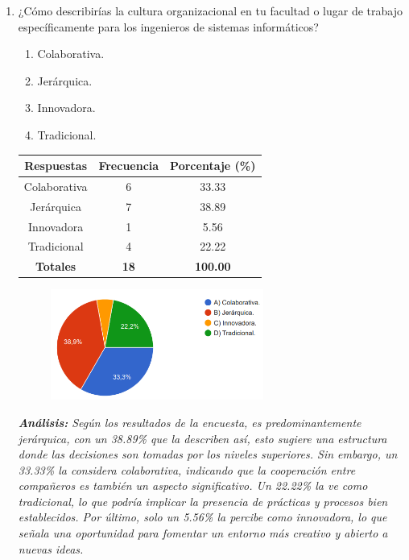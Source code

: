 \documentclass[journal]{IEEEtran}
\begin{document}
\begin{enumerate}
	\item ¿Cómo describirías la cultura organizacional en tu facultad o lugar de trabajo específicamente para los ingenieros de sistemas informáticos?
	\begin{enumerate}
		\item Colaborativa.
		\item Jerárquica.
		\item Innovadora.
		\item Tradicional.
	\end{enumerate}
	\begin{table}[H]
		\renewcommand{\arraystretch}{1.3}
		\centering
		\begin{tabular}{|c|c|c|}
			\hline
			\textbf{Respuestas} & \textbf{Frecuencia} & \textbf{Porcentaje (\%)}\\
			\hline
			Colaborativa & 6 & 33.33\\
			Jerárquica & 7 & 38.89\\
			Innovadora & 1 & 5.56\\
			Tradicional & 4 & 22.22\\
			\hline
			\textbf{Totales} &\textbf{18}& \textbf{100.00}\\
			\hline
		\end{tabular}
	\end{table}
	\begin{figure}[h]
		\centering
		\includegraphics[width=07cm]{Pregunta20}
	\end{figure}
	\textit{\textbf{Análisis:} Según los resultados de la encuesta, es predominantemente jerárquica, con un 38.89\% que la describen así, esto sugiere una estructura donde las decisiones son tomadas por los niveles superiores. Sin embargo, un 33.33\% la considera colaborativa, indicando que la cooperación entre compañeros es también un aspecto significativo. Un 22.22\% la ve como tradicional, lo que podría implicar la presencia de prácticas y procesos bien establecidos. Por último, solo un 5.56\% la percibe como innovadora, lo que señala una oportunidad para fomentar un entorno más creativo y abierto a nuevas ideas.}\\
	

\end{enumerate}
\end{document}
